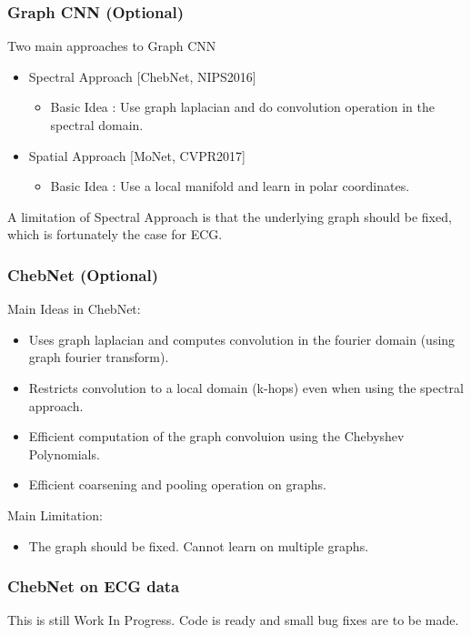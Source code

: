 \documentclass{beamer}
\begin{document}
\begin{frame}
  \frametitle{Graph CNN (Optional)}
  Two main approaches to Graph CNN
  \begin{itemize}
  \item Spectral Approach [ChebNet, NIPS2016]
    \begin{itemize}
    \item Basic Idea : Use graph laplacian and do convolution operation in the spectral domain.
    \end{itemize}
  \item Spatial Approach [MoNet, CVPR2017]
    \begin{itemize}
    \item Basic Idea : Use a local manifold and learn in polar coordinates.
    \end{itemize}
  \end{itemize}
  A limitation of Spectral Approach is that the underlying graph should be fixed, which is fortunately the case for ECG.
\end{frame}

\begin{frame}
  \frametitle{ChebNet (Optional)}
  Main Ideas in ChebNet:
  \begin{itemize}
  \item Uses graph laplacian and computes convolution in the fourier domain (using graph fourier transform).
  \item Restricts convolution to a local domain (k-hops) even when using the spectral approach.
  \item Efficient computation of the graph convoluion using the Chebyshev Polynomials.
  \item Efficient coarsening and pooling operation on graphs.
  \end{itemize}
  Main Limitation:
  \begin{itemize}
  \item The graph should be fixed. Cannot learn on multiple graphs.
  \end{itemize}
\end{frame}

\begin{frame}
  \frametitle{ChebNet on ECG data}
  This is still Work In Progress. Code is ready and small bug fixes are to be made.
\end{frame}
\end{document}
